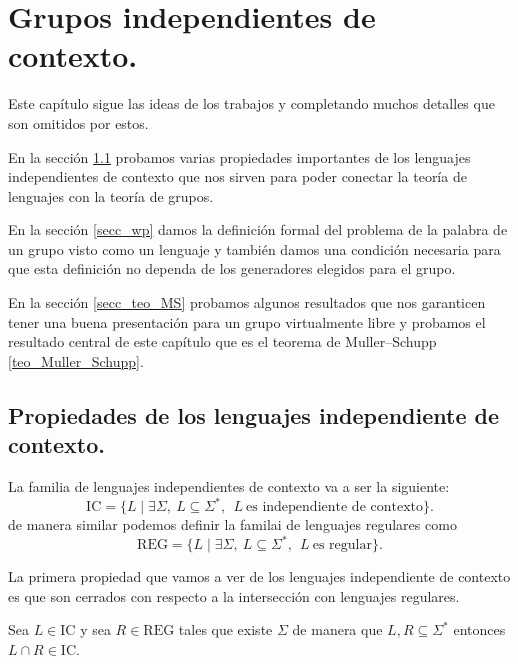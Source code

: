 \documentclass[tesis.tex]{subfiles}
\begin{document}
\chapter{Grupos independientes de contexto.}
Este capítulo sigue las ideas de los trabajos \cite{muller1983groups} y \cite{muller1985theory} completando muchos detalles que son omitidos por estos.

En la sección \ref{secc_grp_ic} probamos varias propiedades importantes de los lenguajes independientes de contexto que nos sirven para poder conectar la teoría de lenguajes con la teoría de grupos.

En la sección \ref{secc_wp} damos la definición formal del problema de la palabra de un grupo visto como un lenguaje y también damos una condición necesaria para que esta definición no dependa de los generadores elegidos para el grupo.


En la sección \ref{secc_teo_MS} probamos algunos resultados que nos garanticen tener una buena presentación para un grupo virtualmente libre y probamos el resultado central de este capítulo que es el teorema de Muller--Schupp \ref{teo_Muller_Schupp}.


\section{Propiedades de los lenguajes independiente de contexto.}\label{secc_grp_ic}

La familia de lenguajes independientes de contexto va a ser la siguiente:
\[
	\text{IC} = \{  L \mid \exists \Sigma, \ L \subseteq \Sigma^*, \ \ L \  \text{es independiente de contexto} \}.
\]
de manera similar podemos definir la familai de lenguajes regulares como
\[
	\text{REG} = \{  L \mid \exists \Sigma, \ L \subseteq \Sigma^*, \ \ L \  \text{es regular}  \}.
\]

La primera propiedad que vamos a ver de los lenguajes independiente de contexto es que son cerrados con respecto a la intersección con lenguajes regulares.

\begin{prop}\label{intersecciones-reg-ic}
	Sea $L \in \text{IC}$ y sea $R \in \text{REG}$ tales que existe $\Sigma$ de manera que $L,R \subseteq \Sigma^{*}$ entonces $L \cap R \in \text{IC}$.	
\end{prop}
\end{document}
